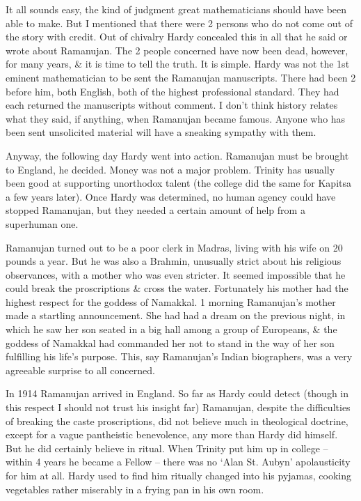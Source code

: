 \documentclass{article}
\numberwithin{equation}{section}
\begin{document}
It all sounds easy, the kind of judgment great mathematicians should have been able to make. But I mentioned that there were 2 persons who do not come out of the story with credit. Out of chivalry Hardy concealed this in all that he said or wrote about Ramanujan. The 2 people concerned have now been dead, however, for many years, \& it is time to tell the truth. It is simple. Hardy was not the 1st eminent mathematician to be sent the Ramanujan manuscripts. There had been 2 before him, both English, both of the highest professional standard. They had each returned the manuscripts without comment. I don't think history relates what they said, if anything, when Ramanujan became famous. Anyone who has been sent unsolicited material will have a sneaking sympathy with them.

Anyway, the following day Hardy went into action. Ramanujan must be brought to England, he decided. Money was not a major problem. Trinity has usually been good at supporting unorthodox talent (the college did the same for Kapitsa a few years later). Once Hardy was determined, no human agency could have stopped Ramanujan, but they needed a certain amount of help from a superhuman one.

Ramanujan turned out to be a poor clerk in Madras, living with his wife on 20 pounds a year. But he was also a Brahmin, unusually strict about his religious observances, with a mother who was even stricter. It seemed impossible that he could break the proscriptions \& cross the water. Fortunately his mother had the highest respect for the goddess of Namakkal. 1 morning Ramanujan's mother made a startling announcement. She had had a dream on the previous night, in which he saw her son seated in a big hall among a group of Europeans, \& the goddess of Namakkal had commanded her not to stand in the way of her son fulfilling his life's purpose. This, say Ramanujan's Indian biographers, was a very agreeable surprise to all concerned.

In 1914 Ramanujan arrived in England. So far as Hardy could detect (though in this respect I should not trust his insight far) Ramanujan, despite the difficulties of breaking the caste proscriptions, did not believe much in theological doctrine, except for a vague pantheistic benevolence, any more than Hardy did himself. But he did certainly believe in ritual. When Trinity put him up in college -- within 4 years he became a Fellow -- there was no `Alan St. Aubyn' apolausticity for him at all. Hardy used to find him ritually changed into his pyjamas, cooking vegetables rather miserably in a frying pan in his own room.
\end{document}
